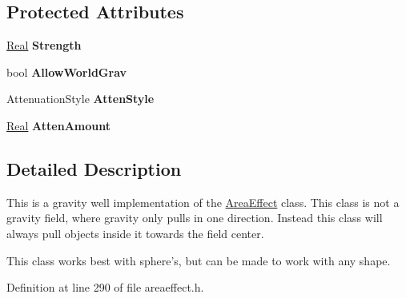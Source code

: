 \subsection*{Protected Attributes}
\begin{DoxyCompactItemize}
\item 
\hypertarget{classphys_1_1GravityWell_acc6e405d39cdc6017040902190e16652}{
\hyperlink{namespacephys_af7eb897198d265b8e868f45240230d5f}{Real} {\bfseries Strength}}
\label{d6/d21/classphys_1_1GravityWell_acc6e405d39cdc6017040902190e16652}

\item 
\hypertarget{classphys_1_1GravityWell_a8b7106e7670a7bc074c245269d211ba0}{
bool {\bfseries AllowWorldGrav}}
\label{d6/d21/classphys_1_1GravityWell_a8b7106e7670a7bc074c245269d211ba0}

\item 
\hypertarget{classphys_1_1GravityWell_a13fda8d3a831a6eba5fd2e03ef2dbcfc}{
AttenuationStyle {\bfseries AttenStyle}}
\label{d6/d21/classphys_1_1GravityWell_a13fda8d3a831a6eba5fd2e03ef2dbcfc}

\item 
\hypertarget{classphys_1_1GravityWell_ad9fd8f2f2dea6a53241ef90852e84503}{
\hyperlink{namespacephys_af7eb897198d265b8e868f45240230d5f}{Real} {\bfseries AttenAmount}}
\label{d6/d21/classphys_1_1GravityWell_ad9fd8f2f2dea6a53241ef90852e84503}

\end{DoxyCompactItemize}


\subsection{Detailed Description}
This is a gravity well implementation of the \hyperlink{classphys_1_1AreaEffect}{AreaEffect} class. This class is not a gravity field, where gravity only pulls in one direction. Instead this class will always pull objects inside it towards the field center. \par
 This class works best with sphere's, but can be made to work with any shape. 

Definition at line 290 of file areaeffect.h.



